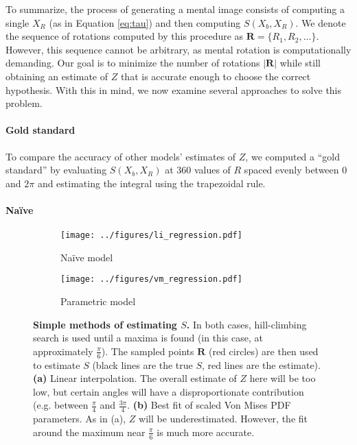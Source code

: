 \documentclass{article} %
\newcommand{\Naive}[0]{Na\"ive}
\begin{document}
To summarize, the process of generating a mental image consists of
computing a single $X_R$ (as in Equation \ref{eq:tau}) and then
computing $S(X_b, X_R)$. We denote the sequence of rotations computed
by this procedure as $\mathbf{R}=\{R_1, R_2, \ldots{}\}$. However,
this sequence cannot be arbitrary, as mental rotation is
computationally demanding. Our goal is to minimize the number of
rotations $\vert\mathbf{R}\vert$ while still obtaining an estimate of
$Z$ that is accurate enough to choose the correct hypothesis. With
this in mind, we now examine several approaches to solve this problem.

\paragraph{Gold standard}

To compare the accuracy of other models' estimates of $Z$, we computed
a ``gold standard'' by evaluating $S(X_b, X_R)$ at 360 values of $R$
spaced evenly between $0$ and $2\pi$ and estimating the integral using
the trapezoidal rule.

\paragraph{\Naive{}}

\begin{figure}[t]
  \centering
  \begin{subfigure}[b]{0.45\textwidth}
    \centering
    \texttt{[image: ../figures/li\_regression.pdf]}
    \caption{\Naive{} model}
    \label{fig:li}
  \end{subfigure}
  \begin{subfigure}[b]{0.45\textwidth}
    \centering
    \texttt{[image: ../figures/vm\_regression.pdf]}
    \caption{Parametric model}
    \label{fig:vm}
  \end{subfigure}
  \caption{\textbf{Simple methods of estimating $S$.} In both cases,
    hill-climbing search is used until a maxima is found (in this
    case, at approximately $\frac{\pi}{6}$). The sampled points
    $\mathbf{R}$ (red circles) are then used to estimate $S$ (black
    lines are the true $S$, red lines are the estimate). \textbf{(a)}
    Linear interpolation. The overall estimate of $Z$ here will be too
    low, but certain angles will have a disproportionate contribution
    (e.g. between $\frac{\pi}{4}$ and $\frac{3\pi}{4}$. \textbf{(b)}
    Best fit of scaled Von Mises PDF parameters. As in (a), $Z$ will
    be underestimated. However, the fit around the maximum near
    $\frac{\pi}{6}$ is much more accurate.}
  \label{fig:simple-models}
\end{figure}
\end{document}
